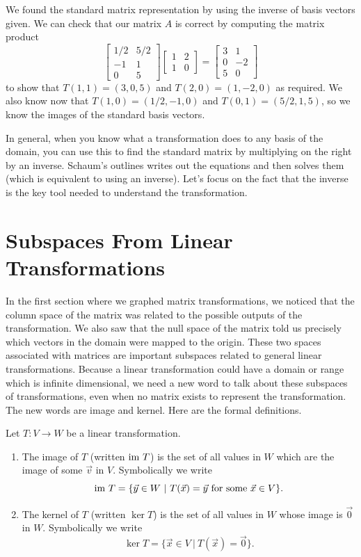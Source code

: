 \begin{example}
We found the standard matrix representation by using the inverse of basis vectors given. We can check that our matrix $A$ is correct by computing the matrix product 
$$\begin{bmatrix}1/2&5/2\\-1&1\\0&5\end{bmatrix}
\begin{bmatrix}1&2\\1&0\end{bmatrix} 
= \begin{bmatrix}3&1\\0&-2\\5&0\end{bmatrix}$$ to show that $T(1,1)=(3,0,5)$ and $T(2,0)=(1,-2,0)$ as required.  We also know now that $T(1,0) = (1/2,-1,0)$ and $T(0,1)=(5/2,1,5)$, so we know the images of the standard basis vectors. 
\end{example}
 
In general, when you know what a transformation does to any basis of the domain, you can use this to find the standard matrix by multiplying on the right by an inverse.  
Schaum's outlines writes out the equations and then solves them (which is equivalent to using an inverse). 
Let's focus on the fact that the inverse is the key tool needed to understand the transformation.




  
\section{Subspaces From Linear Transformations}

In the first section where we graphed matrix transformations, we noticed that the column space of the matrix was related to the possible outputs of the transformation. We also saw that the null space of the matrix told us precisely which vectors in the domain were mapped to the origin.  These two spaces associated with matrices are important subspaces related to general linear transformations.  Because a linear transformation could have a domain or range which is infinite dimensional, we need a new word to talk about these subspaces of transformations, even when no matrix exists to represent the transformation.  The new words are image and kernel. Here are the formal definitions.

\begin{definition}
Let $T:V\to W$ be a linear transformation.  
\begin{enumerate}
	\item The image of $T$ (written $\text{im } T$) is the set of all values in $W$ which are the image of some $\vec v$ in $V$. 
	Symbolically we write $$\text{im } T = \{\vec y\in W \ | \ T(\vec x)=\vec y \text{ for some $\vec x\in V$}\}.$$ 
	\item The kernel of $T$ (written $\ker T$) is the set of all values in $W$ whose image is $\vec 0$ in $W$. 
	Symbolically we write $$\ker T = \{\vec x\in V \ | \ T(\vec x)=\vec 0\}.$$
\end{enumerate}
\end{definition}

